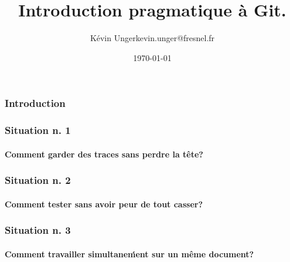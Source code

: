 \documentclass[t]{beamer}
\author{Kévin Unger\newline kevin.unger@fresnel.fr}
\date{\today}
\title{Introduction pragmatique à Git.}
\begin{document}
\frame{\titlepage}
\begin{frame}[label=intro]
        \frametitle{Introduction}
\end{frame}


\begin{frame}[label=sit1]
        \frametitle{Situation n. 1}
        \framesubtitle{Comment garder des traces sans perdre la tête?}
\end{frame}


\begin{frame}[label=sit2]
        \frametitle{Situation n. 2}
        \framesubtitle{Comment tester sans avoir peur de tout casser?}
\end{frame}


\begin{frame}[label=sit3]
        \frametitle{Situation n. 3}
        \framesubtitle{Comment travailler simultane\'ment sur un même document?}
\end{frame}
\end{document}
